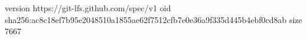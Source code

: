 version https://git-lfs.github.com/spec/v1
oid sha256:ac8c18ef7b95e2048510a1855ae62f7512cfb7e0e36a9f335d445b4ebf0cd8ab
size 7667
